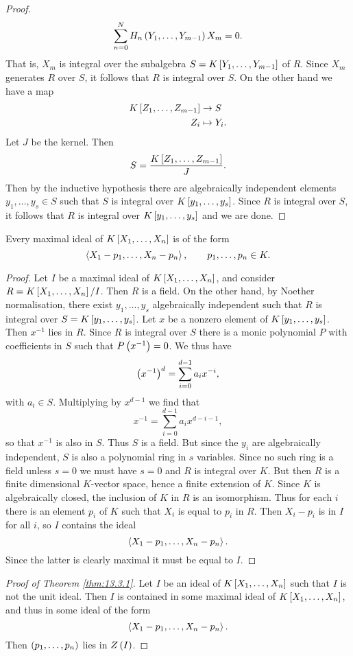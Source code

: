 \begin{proof}
$$ \sum_{n = 0}^N H_n\rb{Y_1, \dots, Y_{m - 1}}X_m = 0. $$
That is, $ X_m $ is integral over the subalgebra $ S = K\sb{Y_1, \dots, Y_{m - 1}} $ of $ R $. Since $ X_m $ generates $ R $ over $ S $, it follows that $ R $ is integral over $ S $. On the other hand we have a map
\begin{align*}
K\sb{Z_1, \dots, Z_{m - 1}} & \to S \\
Z_i & \mapsto Y_i.
\end{align*}
Let $ J $ be the kernel. Then
$$ S = \dfrac{K\sb{Z_1, \dots, Z_{m - 1}}}{J}. $$
Then by the inductive hypothesis there are algebraically independent elements $ y_1, \dots, y_s \in S $ such that $ S $ is integral over $ K\sb{y_1, \dots, y_s} $. Since $ R $ is integral over $ S $, it follows that $ R $ is integral over $ K\sb{y_1, \dots, y_s} $ and we are done.
\end{proof}

\begin{corollary}
Every maximal ideal of $ K\sb{X_1, \dots, X_n} $ is of the form
$$ \ab{X_1 - p_1, \dots, X_n - p_n} , \qquad p_1, \dots, p_n \in K. $$
\end{corollary}

\begin{proof}
Let $ I $ be a maximal ideal of $ K\sb{X_1, \dots, X_n} $, and consider $ R = K\sb{X_1, \dots, X_n} / I $. Then $ R $ is a field. On the other hand, by Noether normalisation, there exist $ y_1, \dots, y_s $ algebraically independent such that $ R $ is integral over $ S = K\sb{y_1, \dots, y_s} $. Let $ x $ be a nonzero element of $ K\sb{y_1, \dots, y_s} $. Then $ x^{-1} $ lies in $ R $. Since $ R $ is integral over $ S $ there is a monic polynomial $ P $ with coefficients in $ S $ such that $ P\rb{x^{-1}} = 0 $. We thus have
$$ \rb{x^{-1}}^d = \sum_{i = 0}^{d - 1} a_ix^{-i}, $$
with $ a_i \in S $. Multiplying by $ x^{d - 1} $ we find that
$$ x^{-1} = \sum_{i = 0}^{d - 1} a_ix^{d - i - 1}, $$
so that $ x^{-1} $ is also in $ S $. Thus $ S $ is a field. But since the $ y_i $ are algebraically independent, $ S $ is also a polynomial ring in $ s $ variables. Since no such ring is a field unless $ s = 0 $ we must have $ s = 0 $ and $ R $ is integral over $ K $. But then $ R $ is a finite dimensional $ K $-vector space, hence a finite extension of $ K $. Since $ K $ is algebraically closed, the inclusion of $ K $ in $ R $ is an isomorphism. Thus for each $ i $ there is an element $ p_i $ of $ K $ such that $ X_i $ is equal to $ p_i $ in $ R $. Then $ X_i - p_i $ is in $ I $ for all $ i $, so $ I $ contains the ideal
$$ \ab{X_1 - p_1, \dots, X_n - p_n}. $$
Since the latter is clearly maximal it must be equal to $ I $.
\end{proof}

\begin{proof}[Proof of Theorem \ref{thm:13.3.1}]
Let $ I $ be an ideal of $ K\sb{X_1, \dots, X_n} $ such that $ I $ is not the unit ideal. Then $ I $ is contained in some maximal ideal of $ K\sb{X_1, \dots, X_n} $, and thus in some ideal of the form
$$ \ab{X_1 - p_1, \dots, X_n - p_n}. $$
Then $ \rb{p_1, \dots, p_n} $ lies in $ Z\rb{I} $.
\end{proof}

